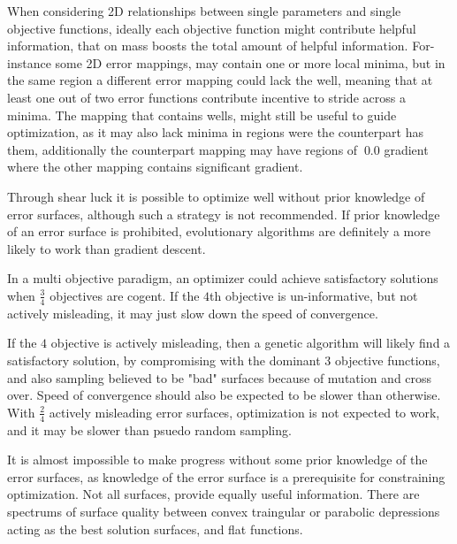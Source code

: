      
   When considering 2D relationships between single parameters and single objective functions, ideally each objective function might contribute helpful information, that on mass boosts the total amount of helpful information. For-instance some 2D error mappings, may contain one or more local minima, but in the same region a different error mapping could lack the well, meaning that at least one out of two error functions contribute incentive to stride across a minima. The mapping that contains wells, might still be useful to guide optimization, as it may also lack minima in regions were the counterpart has them, additionally the counterpart mapping may have regions of $~0.0$ gradient where the other mapping contains significant gradient.
   
   Through shear luck it is possible to optimize well without prior knowledge of error surfaces, although such a strategy is not recommended. If prior knowledge of an error surface is prohibited, evolutionary algorithms are definitely a more likely to work than gradient descent.
   
   In a multi objective paradigm, an optimizer could achieve satisfactory solutions when $\frac{3}{4}$ objectives are cogent. If the $4$th objective is un-informative, but not actively misleading, it may just slow down the speed of convergence.
   
   If the $4$ objective is actively misleading, then a genetic algorithm will likely find a satisfactory solution, by compromising with the dominant $3$ objective functions, and also sampling believed to be "bad" surfaces because of mutation and cross over. Speed of convergence should also be expected to be slower than otherwise. With $\frac{2}{4}$ actively misleading error surfaces, optimization is not expected to work, and it may be slower than psuedo random sampling.
   
   It is almost impossible to make progress without some prior knowledge of the error surfaces, as knowledge of the error surface is a prerequisite for constraining optimization. Not all surfaces, provide equally useful information. There are spectrums of surface quality between convex traingular or parabolic depressions acting as the best solution surfaces, and flat functions. 
   